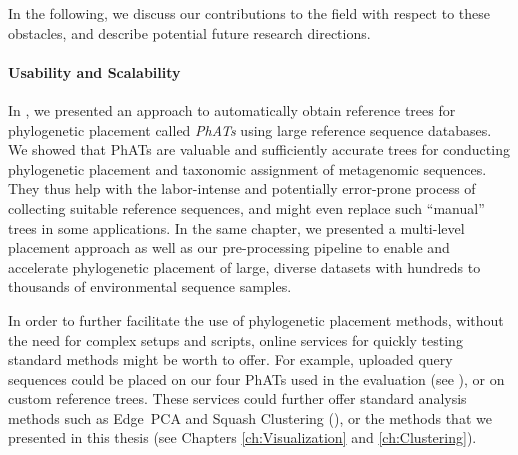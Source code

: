 In the following, we discuss our contributions to the field with respect to these obstacles,
and describe potential future research directions.

\paragraph{Usability and Scalability}
\label{ch:ConclusionOutlook:par:UsabilityScalability}

In , we presented an approach to automatically obtain
reference trees for phylogenetic placement called \emph{\acfp{PhAT}} using large reference sequence databases.
We showed that \acp{PhAT} are valuable and sufficiently accurate trees for
conducting phylogenetic placement and taxonomic assignment of metagenomic sequences.
They thus help with the labor-intense and potentially error-prone process of collecting suitable reference sequences,
and might even replace such ``manual'' trees in some applications.
In the same chapter, we presented a multi-level placement approach as well as our pre-processing pipeline
to enable and accelerate phylogenetic placement
of large, diverse datasets with hundreds to thousands of environmental sequence samples.

In order to further facilitate the use of phylogenetic placement methods,
without the need for complex setups and scripts, online services for quickly testing standard methods might be worth to offer.
For example, uploaded query sequences could be placed on our four \acp{PhAT} used in the evaluation
(see ),
or on custom reference trees.
These services could further offer standard analysis methods such as Edge~PCA and Squash Clustering
(),
or the methods that we presented in this thesis (see Chapters \ref{ch:Visualization} and \ref{ch:Clustering}).

